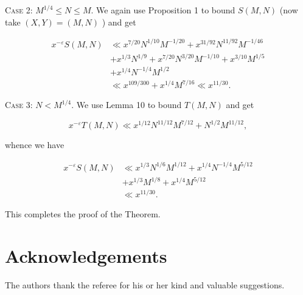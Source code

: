 \documentclass[10pt]{article}
\begin{document}
\medskip\noindent\textsc{Case 2:} $M^{1 / 4} \leq N \leq M$. We again use Proposition 1 to bound $S(M, N)$ (now take $(X, Y)=(M, N)$ ) and get


\begin{align*}
x^{-\varepsilon} S(M, N) & \ll x^{7 / 20} N^{1 / 10} M^{-1 / 20}+x^{31 / 92} N^{11 / 92} M^{-1 / 46}  \tag{4.6}\\
& +x^{1 / 3} N^{1 / 9}+x^{7 / 20} N^{3 / 20} M^{-1 / 10}+x^{3 / 10} M^{1 / 5} \\
& +x^{1 / 4} N^{-1 / 4} M^{1 / 2} \\
& \ll x^{109 / 300}+x^{1 / 4} M^{7 / 16} \ll x^{11 / 30}.
\end{align*}


\medskip\noindent\textsc{Case 3:} $N<M^{1 / 4}$. We use Lemma 10 to bound $T(M, N)$ and get

$$
x^{-\varepsilon} T(M, N) \ll x^{1 / 12} N^{11 / 12} M^{7 / 12}+N^{1 / 2} M^{11 / 12},
$$

whence we have


\begin{align*}
x^{-\varepsilon} S(M, N) & \ll x^{1 / 3} N^{1 / 6} M^{1 / 12}+x^{1 / 4} N^{-1 / 4} M^{5 / 12}  \tag{4.7}\\
& +x^{1 / 3} M^{1 / 8}+x^{1 / 4} M^{5 / 12} \\
& \ll x^{11 / 30}.
\end{align*}


This completes the proof of the Theorem.

\section*{Acknowledgements}
The authors thank the referee for his or her kind and valuable suggestions.
\end{document}
